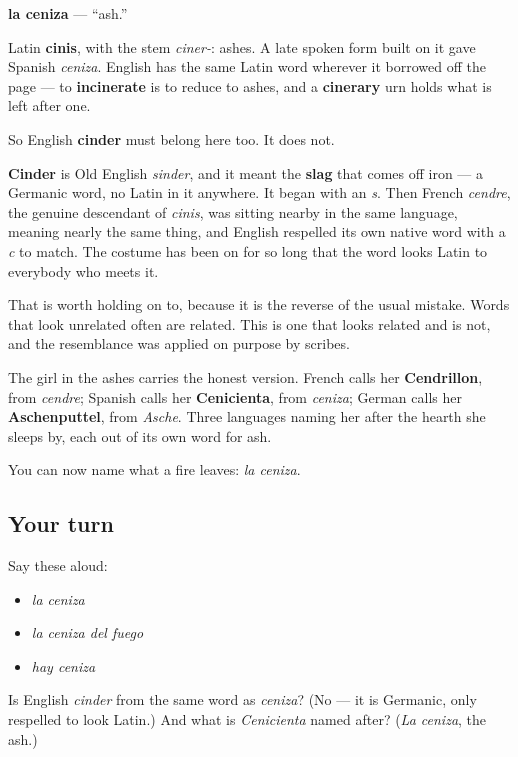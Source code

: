 \begin{cousinweb}
\textbf{la ceniza} — \textquotedblleft{}ash.\textquotedblright{}

Latin \textbf{cinis}, with the stem \emph{ciner-}: ashes. A late spoken form built on it gave Spanish \emph{ceniza}. English has the same Latin word wherever it borrowed off the page — to \textbf{incinerate} is to reduce to ashes, and a \textbf{cinerary} urn holds what is left after one.

So English \textbf{cinder} must belong here too. It does not.

\textbf{Cinder} is Old English \emph{sinder}, and it meant the \textbf{slag} that comes off iron — a Germanic word, no Latin in it anywhere. It began with an \emph{s}. Then French \emph{cendre}, the genuine descendant of \emph{cinis}, was sitting nearby in the same language, meaning nearly the same thing, and English respelled its own native word with a \emph{c} to match. The costume has been on for so long that the word looks Latin to everybody who meets it.

That is worth holding on to, because it is the reverse of the usual mistake. Words that look unrelated often are related. This is one that looks related and is not, and the resemblance was applied on purpose by scribes.

The girl in the ashes carries the honest version. French calls her \textbf{Cendrillon}, from \emph{cendre}; Spanish calls her \textbf{Cenicienta}, from \emph{ceniza}; German calls her \textbf{Aschenputtel}, from \emph{Asche}. Three languages naming her after the hearth she sleeps by, each out of its own word for ash.
\end{cousinweb}

\begin{grammarlens}[title={What you've built}]
You can now name what a fire leaves: \emph{la ceniza}.
\end{grammarlens}

\subsection*{Your turn}
Say these aloud:

\begin{itemize}
\raggedright
  \item \emph{la ceniza}
  \item \emph{la ceniza del fuego}
  \item \emph{hay ceniza}
\end{itemize}

\begin{tcolorbox}[breakable,colback=teal!4,colframe=teal!35!black,title={Before you move on}]
Is English \emph{cinder} from the same word as \emph{ceniza}? (No — it is Germanic, only respelled to look Latin.) And what is \emph{Cenicienta} named after? (\emph{La ceniza}, the ash.)
\end{tcolorbox}
